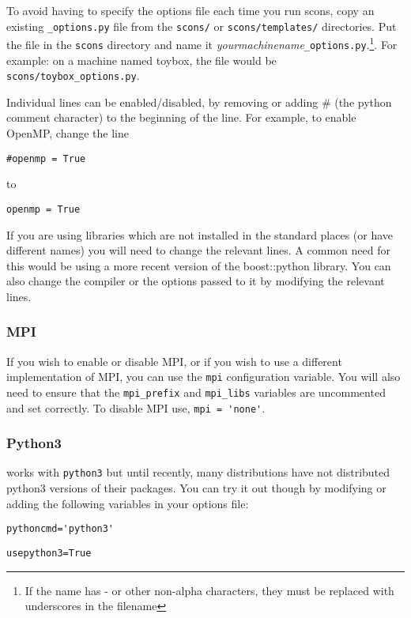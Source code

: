 To avoid having to specify the options file each time you run scons, copy an existing \texttt{_options.py} file from the 
\texttt{scons/} or \texttt{scons/templates/} directories. Put the file in the \texttt{scons} directory and name 
it \textit{yourmachinename}\texttt{_options.py}.\footnote{If the name 
has - or other non-alpha characters, they must be replaced with underscores in the filename}.
For example: on a machine named toybox, the file would be \texttt{scons/toybox_options.py}.

Individual lines can be enabled/disabled, by removing or adding \# (the python comment character) to the beginning of the line.
For example, to enable OpenMP, change the line
\begin{verbatim}
#openmp = True 
\end{verbatim}
to
\begin{verbatim}
openmp = True 
\end{verbatim}

If you are using libraries which are not installed in the standard places (or have different names) you will need to 
change the relevant lines.
A common need for this would be using a more recent version of the boost::python library.
You can also change the compiler or the options passed to it by modifying the relevant lines.

\subsubsection*{MPI}
If you wish to enable or disable MPI, or if you wish to use a different implementation of MPI, you can use the \texttt{mpi}
configuration variable.
You will also need to ensure that the \texttt{mpi_prefix} and \texttt{mpi_libs} variables are uncommented and set correctly.
To disable MPI use, \verb|mpi = 'none'|.

\subsubsection{Python3}
\escript works with \texttt{python3} but until recently, many distributions have not distributed python3 versions of their packages.
You can try it out though by modifying or adding the following variables in your options file:

\begin{verbatim}
pythoncmd='python3'
\end{verbatim}

\begin{verbatim}
usepython3=True
\end{verbatim}

